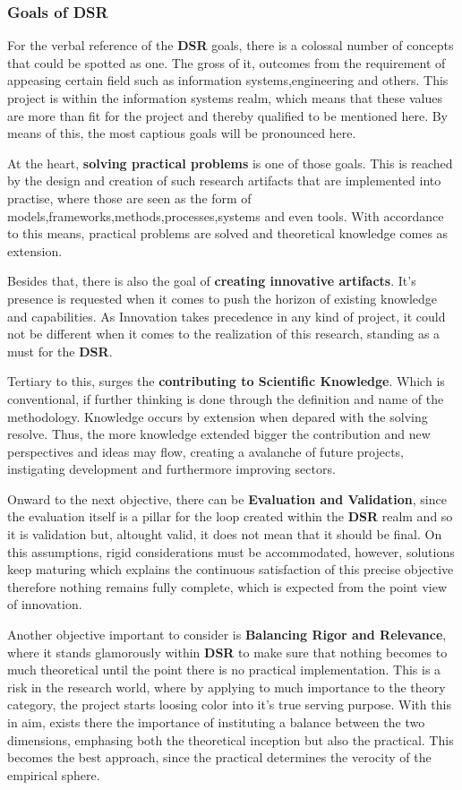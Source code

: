 \subsubsection{Goals of DSR}
For the verbal reference of the \textbf{DSR} goals, there is a colossal number of concepts that could be spotted as one. The gross of it, outcomes from the requirement of appeasing certain field such as information systems,engineering and others. This project is within the information systems realm, which means that these values are more than fit for the project and thereby qualified to be mentioned here. By means of this, the most captious goals will be pronounced here.

At the heart, \textbf{solving practical problems} is one of those goals. This is reached by the design and creation of such research artifacts that are implemented into practise, where those are seen as the form of models,frameworks,methods,processes,systems and even tools. With accordance to this means, practical problems are solved and theoretical knowledge comes as extension.

Besides that, there is also the goal of \textbf{creating innovative artifacts}. It's presence is requested when it comes to push the horizon of existing knowledge and capabilities. As Innovation takes precedence in any kind of project, it could not be different when it comes to the realization of this research, standing as a must for the \textbf{DSR}.

Tertiary to this, surges the \textbf{contributing to Scientific Knowledge}. Which is conventional, if further thinking is done through the definition and name of the methodology. Knowledge occurs by extension when depared with the solving resolve. Thus, the more knowledge extended bigger the contribution and new perspectives and ideas may flow, creating a avalanche of future projects, instigating development and furthermore improving sectors.

Onward to the next objective, there can be \textbf{Evaluation and Validation}, since the evaluation itself is a pillar for the loop created within the \textbf{DSR} realm and so it is validation but, altought valid, it does not mean that it should be final. On this assumptions, rigid considerations must be accommodated, however, solutions keep maturing which explains the continuous satisfaction of this precise objective therefore nothing remains fully complete, which is expected from the point view of innovation.

Another objective important to consider is \textbf{Balancing Rigor and Relevance}, where it stands glamorously within \textbf{DSR} to make sure that nothing becomes to much theoretical until the point there is no practical implementation. This is a risk in the research world, where by applying to much importance to the theory category, the project starts loosing color into it's true serving purpose. With this in aim, exists there the importance of instituting a balance between the two dimensions, emphasing both the theoretical inception but also the practical. This becomes the best approach, since the practical determines the verocity of the empirical sphere.


